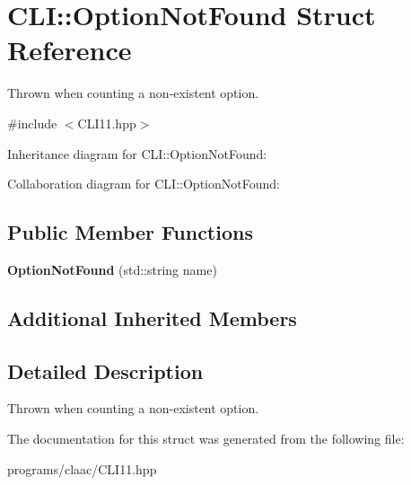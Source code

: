 \hypertarget{struct_c_l_i_1_1_option_not_found}{}\section{C\+LI\+:\+:Option\+Not\+Found Struct Reference}
\label{struct_c_l_i_1_1_option_not_found}


Thrown when counting a non-\/existent option.  




{\ttfamily \#include $<$C\+L\+I11.\+hpp$>$}



Inheritance diagram for C\+LI\+:\+:Option\+Not\+Found\+:


Collaboration diagram for C\+LI\+:\+:Option\+Not\+Found\+:
\subsection*{Public Member Functions}
\begin{DoxyCompactItemize}
\item 
\mbox{\label{struct_c_l_i_1_1_option_not_found_a0abf448c748239711b5ed963f388ec1d}} 
{\bfseries Option\+Not\+Found} (std\+::string name)
\end{DoxyCompactItemize}
\subsection*{Additional Inherited Members}


\subsection{Detailed Description}
Thrown when counting a non-\/existent option. 

The documentation for this struct was generated from the following file\+:\begin{DoxyCompactItemize}
\item 
programs/claac/C\+L\+I11.\+hpp\end{DoxyCompactItemize}
